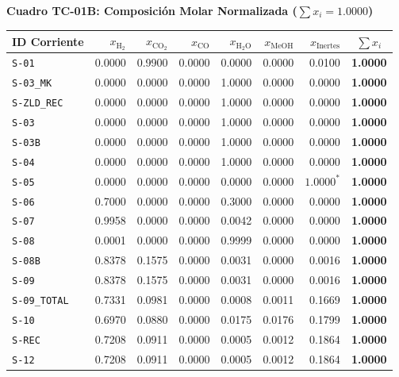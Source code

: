 \documentclass[11pt,letterpaper]{article}
\begin{document}
\newpage
\noindent\textbf{Cuadro TC-01B: Composición Molar Normalizada ($\sum x_i = 1.0000$)}
\begin{center}
\footnotesize
\setlength{\tabcolsep}{4.5pt}
\begin{tabularx}{\textwidth}{lrrrrrrc}
\toprule
\textbf{ID Corriente} & \textbf{$x_{\text{H}_2}$} & \textbf{$x_{\text{CO}_2}$} & \textbf{$x_{\text{CO}}$} & \textbf{$x_{\text{H}_2\text{O}}$} & \textbf{$x_{\text{MeOH}}$} & \textbf{$x_{\text{Inertes}}$} & \textbf{$\sum x_i$} \\
\midrule
\texttt{S-01} & 0.0000 & 0.9900 & 0.0000 & 0.0000 & 0.0000 & 0.0100 & \textbf{1.0000} \\
\texttt{S-03\_MK} & 0.0000 & 0.0000 & 0.0000 & 1.0000 & 0.0000 & 0.0000 & \textbf{1.0000} \\
\texttt{S-ZLD\_REC} & 0.0000 & 0.0000 & 0.0000 & 1.0000 & 0.0000 & 0.0000 & \textbf{1.0000} \\
\texttt{S-03} & 0.0000 & 0.0000 & 0.0000 & 1.0000 & 0.0000 & 0.0000 & \textbf{1.0000} \\
\texttt{S-03B} & 0.0000 & 0.0000 & 0.0000 & 1.0000 & 0.0000 & 0.0000 & \textbf{1.0000} \\
\texttt{S-04} & 0.0000 & 0.0000 & 0.0000 & 1.0000 & 0.0000 & 0.0000 & \textbf{1.0000} \\
\texttt{S-05} & 0.0000 & 0.0000 & 0.0000 & 0.0000 & 0.0000 & $1.0000^*$ & \textbf{1.0000} \\
\texttt{S-06} & 0.7000 & 0.0000 & 0.0000 & 0.3000 & 0.0000 & 0.0000 & \textbf{1.0000} \\
\texttt{S-07} & 0.9958 & 0.0000 & 0.0000 & 0.0042 & 0.0000 & 0.0000 & \textbf{1.0000} \\
\texttt{S-08} & 0.0001 & 0.0000 & 0.0000 & 0.9999 & 0.0000 & 0.0000 & \textbf{1.0000} \\
\texttt{S-08B} & 0.8378 & 0.1575 & 0.0000 & 0.0031 & 0.0000 & 0.0016 & \textbf{1.0000} \\
\texttt{S-09} & 0.8378 & 0.1575 & 0.0000 & 0.0031 & 0.0000 & 0.0016 & \textbf{1.0000} \\
\texttt{S-09\_TOTAL} & 0.7331 & 0.0981 & 0.0000 & 0.0008 & 0.0011 & 0.1669 & \textbf{1.0000} \\
\texttt{S-10} & 0.6970 & 0.0880 & 0.0000 & 0.0175 & 0.0176 & 0.1799 & \textbf{1.0000} \\
\texttt{S-REC} & 0.7208 & 0.0911 & 0.0000 & 0.0005 & 0.0012 & 0.1864 & \textbf{1.0000} \\
\texttt{S-12} & 0.7208 & 0.0911 & 0.0000 & 0.0005 & 0.0012 & 0.1864 & \textbf{1.0000} \\

\end{tabularx}
\end{center}
\end{document}
